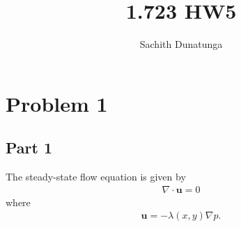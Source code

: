 \documentclass{article}
\title{1.723 HW5}
\author{Sachith  Dunatunga}
\begin{document}
\maketitle

\section{Problem 1}
\subsection{Part 1}
The steady-state flow equation is given by
\begin{align}
\nabla \cdot \mathbf{u} = 0
\end{align}
where
\begin{align}
\mathbf{u} = -\lambda(x,y) \nabla p.
\end{align}
\end{document}
